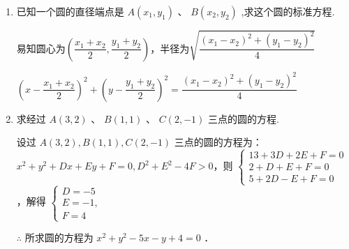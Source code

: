 \begin{enumerate}
    \item 已知一个圆的直径端点是 $A\left( {{x}_{1},{y}_{1}}\right)$ 、 $B\left( {{x}_{2},{y}_{2}}\right)$ ,求这个圆的标准方程.
    \begin{jieda}
        易知圆心为$\left(\dfrac{x_1+x_2}{2}, \dfrac{y_1+y_2}{2}\right)$，半径为$\sqrt{\dfrac{\left(x_1-x_2\right)^2+\left(y_1-y_2\right)^2}{4}}$
    
        $\left(x-\dfrac{x_1+x_2}{2}\right)^2+\left(y-\dfrac{y_1+y_2}{2}\right)^2=\dfrac{\left(x_1-x_2\right)^2+\left(y_1-y_2\right)^2}{4}$
    \end{jieda}

    \item 求经过 $A\left( {3,2}\right)$ 、 $B\left( {1,1}\right)$ 、 $C\left( {2, - 1}\right)$ 三点的圆的方程.
    \begin{jieda}
        设过 $A(3,2), B(1,1), C(2,-1)$ 三点的圆的方程为：$x^2+y^2+D x+E y+F=0, D^2+E^2-4 F>0$，则 $\left\{\begin{array}{l}13+3 D+2 E+F=0 \\ 2+D+E+F=0 \\ 5+2 D-E+F=0\end{array}\right.$ ，解得 $\left\{\begin{array}{l}D=-5 \\ E=-1, \\ F=4\end{array}\right.$
        
        $\therefore$ 所求圆的方程为 $x^2+y^2-5 x-y+4=0$ ．
    \end{jieda}
    
\end{enumerate}


